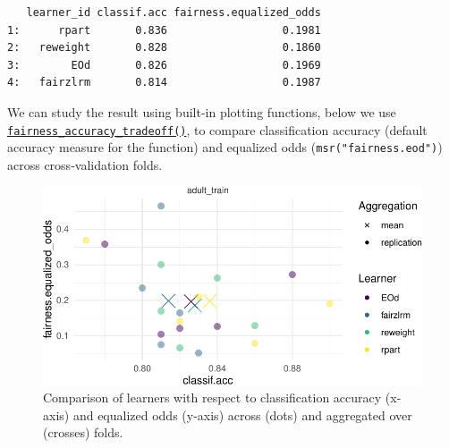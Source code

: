 \begin{verbatim}
   learner_id classif.acc fairness.equalized_odds
1:      rpart       0.836                  0.1981
2:   reweight       0.828                  0.1860
3:        EOd       0.826                  0.1969
4:   fairzlrm       0.814                  0.1987
\end{verbatim}

We can study the result using built-in plotting functions, below we use
\href{https://mlr3fairness.mlr-org.com/reference/fairness_accuracy_tradeoff.html}{\texttt{fairness\_accuracy\_tradeoff()}},
to compare classification accuracy (default accuracy measure for the
function) and equalized odds (\texttt{msr("fairness.eod")}) across
cross-validation folds.

\begin{Shaded}
\begin{Highlighting}[]
 \NormalTok{(}\NormalTok{),}
   \NormalTok{(}\NormalTok{)) }\SpecialCharTok{+}
\SpecialCharTok{::}\NormalTok{(}\NormalTok{) }\SpecialCharTok{+}
\SpecialCharTok{::}\NormalTok{()}
\end{Highlighting}
\end{Shaded}

\begin{figure}[H]

{\centering \includegraphics[width=1\textwidth,height=\textheight]{chapters/chapter14/algorithmic_fairness_files/figure-pdf/fig-fairness-tradeoff-1.pdf}

}

\caption{\label{fig-fairness-tradeoff}Comparison of learners with
respect to classification accuracy (x-axis) and equalized odds (y-axis)
across (dots) and aggregated over (crosses) folds.}

\end{figure}

